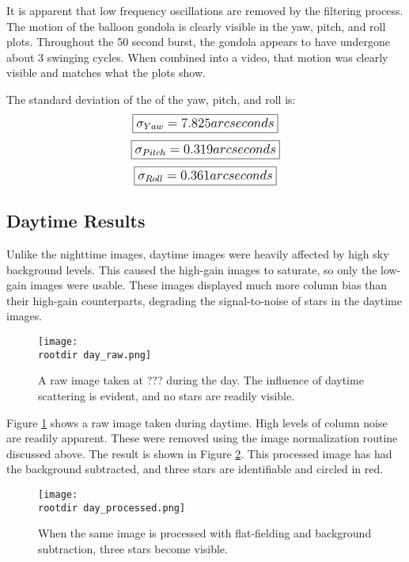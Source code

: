\documentclass[twocolumn,letterpaper]{IEEEAerospace2012}
\newcommand{\rootdir}{./Figures/}
\begin{document}
It is apparent that low frequency oscillations are removed by the filtering process. The motion of the balloon gondola is clearly visible in the yaw, pitch, and roll plots. Throughout the 50 second burst, the gondola appears to have undergone about 3 swinging cycles. When combined into a video, that motion was clearly visible and matches what the plots show. 

The standard deviation of the of the yaw, pitch, and roll is:
\begin{displaymath}\large
    \boxed{\sigma_{Yaw} = 7.825 arcseconds}
\end{displaymath}
\begin{displaymath}\large
    \boxed{\sigma_{Pitch} = 0.319 arcseconds}
\end{displaymath}
\begin{displaymath}\large
    \boxed{\sigma_{Roll} = 0.361 arcseconds}
\end{displaymath}



\subsection{Daytime Results}

Unlike the nighttime images, daytime images were heavily affected by high sky background levels. This caused the high-gain images to saturate, so only the low-gain images were usable. These images displayed much more column bias than their high-gain counterparts, degrading the signal-to-noise of stars in the daytime images. 
\begin{figure}[H]
    \centering
    \texttt{[image: \\rootdir day\_raw.png]}
    \caption{A raw image taken at ??? during the day. The influence of daytime scattering is evident, and no stars are readily visible.}
    \label{fig:day_raw}
\end{figure}

Figure \ref{fig:day_raw} shows a raw image taken during daytime. High levels of column noise are readily apparent. These were removed using the image normalization routine discussed above. The result is shown in Figure \ref{fig:day_processed}. This processed image has had the background subtracted, and three stars are identifiable and circled in red.
\begin{figure}[H]
    \centering
    \texttt{[image: \\rootdir day\_processed.png]}
    \caption{When the same image is processed with flat-fielding and background subtraction, three stars become visible.}
    \label{fig:day_processed}
\end{figure}
\end{document}
